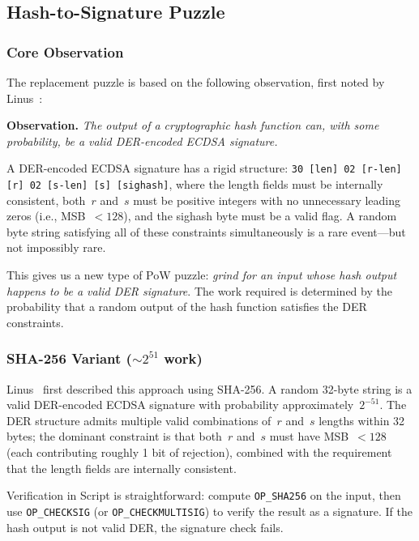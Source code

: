 \documentclass[11pt, a4paper]{article}
\begin{document}
\subsection{Hash-to-Signature Puzzle}
\label{sec:hash-puzzle}

\subsubsection{Core Observation}

The replacement puzzle is based on the following observation, first noted by Linus~\cite{linus2024sha2ecdsa}:

\medskip
\noindent\textbf{Observation.} \textit{The output of a cryptographic hash function can, with some probability, be a valid DER-encoded ECDSA signature.}
\medskip

A DER-encoded ECDSA signature has a rigid structure: \texttt{30 [len] 02 [r-len] [r] 02 [s-len] [s] [sighash]}, where the length fields must be internally consistent, both~$r$ and~$s$ must be positive integers with no unnecessary leading zeros (i.e., MSB~$< 128$), and the sighash byte must be a valid flag. A random byte string satisfying all of these constraints simultaneously is a rare event---but not impossibly rare.

This gives us a new type of PoW puzzle: \emph{grind for an input whose hash output happens to be a valid DER signature}. The work required is determined by the probability that a random output of the hash function satisfies the DER constraints.

\subsubsection{SHA-256 Variant (${\sim}2^{51}$ work)}

Linus~\cite{linus2024sha2ecdsa} first described this approach using SHA-256. A random 32-byte string is a valid DER-encoded ECDSA signature with probability approximately~$2^{-51}$. The DER structure admits multiple valid combinations of~$r$ and~$s$ lengths within 32 bytes; the dominant constraint is that both~$r$ and~$s$ must have MSB~$< 128$ (each contributing roughly 1 bit of rejection), combined with the requirement that the length fields are internally consistent.

Verification in Script is straightforward: compute \texttt{OP\_SHA256} on the input, then use \texttt{OP\_CHECKSIG} (or \texttt{OP\_CHECKMULTISIG}) to verify the result as a signature. If the hash output is not valid DER, the signature check fails.
\end{document}
